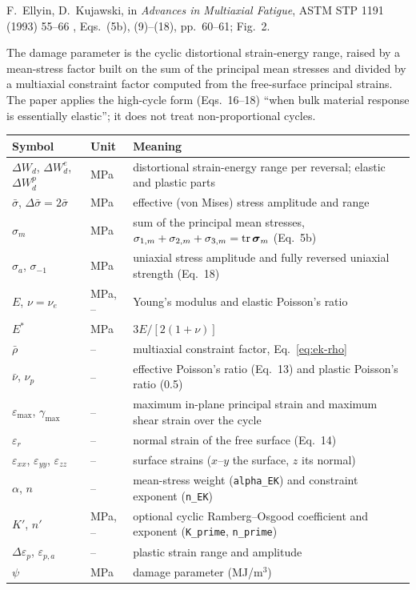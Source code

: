 \label{sheet:EK}

 F.~Ellyin, D.~Kujawski, in \emph{Advances in Multiaxial Fatigue}, ASTM STP 1191
(1993) 55--66 \cite{ellyin1993}, Eqs.~(5b), (9)--(18), pp.~60--61; Fig.~2.

 The damage parameter is the cyclic distortional strain-energy range, raised
by a mean-stress factor built on the sum of the principal mean stresses and divided by a
multiaxial constraint factor computed from the free-surface principal strains. The paper applies
the high-cycle form (Eqs.~16--18) ``when bulk material response is essentially elastic''; it does
not treat non-proportional cycles.

\begin{center}\small
\begin{tabular}{@{}llp{100mm}@{}}
\toprule
Symbol & Unit & Meaning\\\midrule
$\Delta W_d$, $\Delta W_d^e$, $\Delta W_d^p$ & MPa & distortional strain-energy range per reversal; elastic and plastic parts\\
$\bar\sigma$, $\Delta\bar\sigma=2\bar\sigma$ & MPa & effective (von Mises) stress amplitude and range\\
$\sigma_m$ & MPa & sum of the principal mean stresses, $\sigma_{1,m}+\sigma_{2,m}+\sigma_{3,m}=\operatorname{tr}\boldsymbol\sigma_m$ (Eq.~5b)\\
$\sigma_a$, $\sigma_{-1}$ & MPa & uniaxial stress amplitude and fully reversed uniaxial strength (Eq.~18)\\
$E$, $\nu=\nu_e$ & MPa, -- & Young's modulus and elastic Poisson's ratio\\
$E^*$ & MPa & $3E/[2(1+\nu)]$\\
$\bar\rho$ & -- & multiaxial constraint factor, Eq.~\eqref{eq:ek-rho}\\
$\bar\nu$, $\nu_p$ & -- & effective Poisson's ratio (Eq.~13) and plastic Poisson's ratio (0.5)\\
$\varepsilon_{\max}$, $\gamma_{\max}$ & -- & maximum in-plane principal strain and maximum shear strain over the cycle\\
$\varepsilon_r$ & -- & normal strain of the free surface (Eq.~14)\\
$\varepsilon_{xx}$, $\varepsilon_{yy}$, $\varepsilon_{zz}$ & -- & surface strains ($x$--$y$ the surface, $z$ its normal)\\
$\alpha$, $n$ & -- & mean-stress weight (\texttt{alpha\_EK}) and constraint exponent (\texttt{n\_EK})\\
$K'$, $n'$ & MPa, -- & optional cyclic Ramberg--Osgood coefficient and exponent (\texttt{K\_prime}, \texttt{n\_prime})\\
$\Delta\varepsilon_p$, $\varepsilon_{p,a}$ & -- & plastic strain range and amplitude\\
$\psi$ & MPa & damage parameter (MJ/m$^3$)\\
\bottomrule
\end{tabular}
\end{center}

